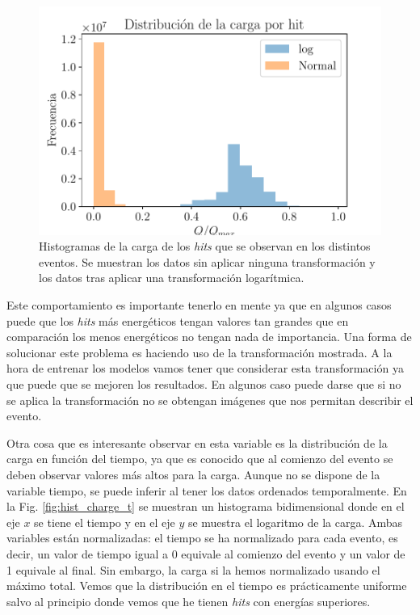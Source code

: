 \documentclass[a4paper,12pt,twoside,titlepage]{article}
\begin{document}
\begin{figure}[h!]
  \centering
  \includegraphics[scale=0.85]{hist_charge.pdf}
  \caption{Histogramas de la carga de los \textit{hits} que se observan en los distintos eventos. Se muestran los datos sin aplicar ninguna transformación y los datos tras aplicar una transformación logarítmica.}
  \label{fig:hist_charge}
\end{figure}


Este comportamiento es importante tenerlo en mente ya que en algunos casos puede que los \textit{hits} más energéticos tengan valores tan grandes que en comparación los menos energéticos no tengan nada de importancia. Una forma de solucionar este problema es haciendo uso de la transformación mostrada. A la hora de entrenar los modelos vamos tener que considerar esta transformación ya que puede que se mejoren los resultados. En algunos caso puede darse que si no se aplica la transformación no se obtengan imágenes que nos permitan describir el evento.

Otra cosa que es interesante observar en esta variable es la distribución de la carga en función del tiempo, ya que es conocido que al comienzo del evento se deben observar valores más altos para la carga. Aunque no se dispone de la variable tiempo, se puede inferir al tener los datos ordenados temporalmente. En la Fig. \ref{fig:hist_charge_t} se muestran un histograma bidimensional donde en el eje $x$ se tiene el tiempo y en el eje $y$ se muestra el logaritmo de la carga. Ambas variables están normalizadas: el tiempo se ha normalizado para cada evento, es decir, un valor de tiempo igual a 0 equivale al comienzo del evento y un valor de 1 equivale al final. Sin embargo, la carga si la hemos normalizado usando el máximo total. Vemos que la distribución en el tiempo es prácticamente uniforme salvo al principio donde vemos que he tienen \textit{hits} con energías superiores.
\end{document}
